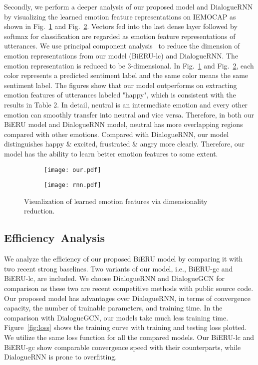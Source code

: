 \documentclass[journal]{IEEEtran}
\begin{document}
Secondly, we perform a deeper analysis of our proposed model and DialogueRNN by visualizing the learned emotion feature representations on IEMOCAP as shown in Fig.~\ref{fig:Dimensionality Reduction of BiERU} and Fig.~\ref{fig:Dimensionality Reduction of DialogueRNN}. Vectors fed into the last dense layer followed by softmax for classification are regarded as emotion feature representations of utterances. We use principal component analysis~\cite{wold1987principal} to reduce the dimension of emotion representations from our model (BiERU-lc) and DialogueRNN. The emotion representation is reduced to be 3-dimensional. In Fig.~\ref{fig:Dimensionality Reduction of BiERU} and Fig.~\ref{fig:Dimensionality Reduction of DialogueRNN}, each color represents a predicted sentiment label and the same color means the same sentiment label. The figures show that our model outperforms on extracting emotion features of utterances labeled "happy", which is consistent with the results in Table 2. In detail, neutral is an intermediate emotion and every other emotion can smoothly transfer into neutral and vice versa. Therefore, in both our BiERU model and DialogueRNN model, neutral has more overlapping regions compared with other emotions. Compared with DialogueRNN, our model distinguishes happy \& excited, frustrated \& angry more clearly. Therefore, our model has the ability to learn better emotion features to some extent.

\begin{figure}[ht!]
\centering
\begin{subfigure}{0.45\textwidth}
    \texttt{[image: our.pdf]}
    \label{fig:Dimensionality Reduction of BiERU}
\end{subfigure}
\begin{subfigure}{0.45\textwidth}
    \texttt{[image: rnn.pdf]}
\label{fig:Dimensionality Reduction of DialogueRNN}
\end{subfigure}
\linespread{1}
\caption{Visualization of learned emotion features via dimensionality reduction.}
\label{fig:DR}
\end{figure}{}

\subsection{Efficiency~Analysis}
We analyze the efficiency of our proposed BiERU model by comparing it with two recent strong baselines. 
Two variants of our model, i.e., BiERU-gc and BiERU-lc, are included.
We choose DialogueRNN and DialogueGCN for comparison as these two are recent competitive methods with public source code. 
Our proposed model has advantages over DialogueRNN, in terms of convergence capacity, the number of trainable parameters, and training time.
In the comparison with DialogueGCN, our models take much less training time. 
Figure~\ref{fig:loss} shows the training curve with training and testing loss plotted. We utilize the same loss function for all the compared models.
Our BiERU-lc and BiERU-gc show comparable convergence speed with their counterparts, while DialogueRNN is prone to overfitting. 
\end{document}

